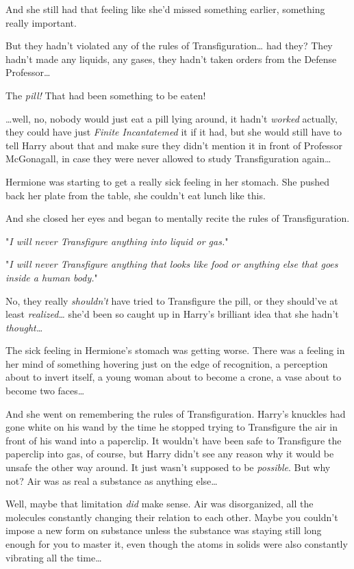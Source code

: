 And she still had that feeling like she'd missed something earlier, something 
really important.

But they hadn't violated any of the rules of Transfiguration{\ldots} had they? 
They hadn't made any liquids, any gases, they hadn't taken orders from the 
Defense Professor{\ldots}

The \emph{pill!} That had been something to be eaten!

{\ldots}well, no, nobody would just eat a pill lying around, it hadn't 
\emph{worked} actually, they could have just \emph{Finite Incantatemed} it if 
it had, but she would still have to tell Harry about that and make sure they 
didn't mention it in front of Professor McGonagall, in case they were never 
allowed to study Transfiguration again{\ldots}

Hermione was starting to get a really sick feeling in her stomach. She pushed 
back her plate from the table, she couldn't eat lunch like this.

And she closed her eyes and began to mentally recite the rules of 
Transfiguration.

"\emph{I will never Transfigure anything into liquid or gas.}"

"\emph{I will never Transfigure anything that looks like food or anything else 
that goes inside a human body.}"

No, they really \emph{shouldn't} have tried to Transfigure the pill, or they 
should've at least \emph{realized{\ldots}} she'd been so caught up in Harry's 
brilliant idea that she hadn't \emph{thought{\ldots}}

The sick feeling in Hermione's stomach was getting worse. There was a feeling 
in her mind of something hovering just on the edge of recognition, a perception 
about to invert itself, a young woman about to become a crone, a vase about to 
become two faces{\ldots}

And she went on remembering the rules of Transfiguration.
\sbreak
Harry's knuckles had gone white on his wand by the time he stopped trying to 
Transfigure the air in front of his wand into a paperclip. It wouldn't have 
been safe to Transfigure the paperclip into gas, of course, but Harry didn't 
see any reason why it would be unsafe the other way around. It just wasn't 
supposed to be \emph{possible}. But why not? Air was as real a substance as 
anything else{\ldots}

Well, maybe that limitation \emph{did} make sense. Air was disorganized, all 
the molecules constantly changing their relation to each other. Maybe you 
couldn't impose a new form on substance unless the substance was staying still 
long enough for you to master it, even though the atoms in solids were also 
constantly vibrating all the time{\ldots}

